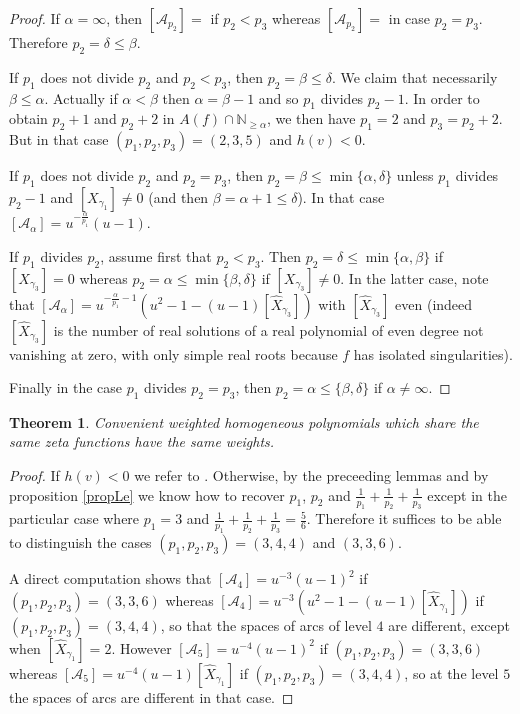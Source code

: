 \documentclass[12pt,a4paper,leqno]{amsart}
\newtheorem{thm}{Theorem}[section]
\theoremstyle{definition}
\begin{document}
\begin{proof}
If $\alpha =\infty$, then $[\mathcal A_{p_2}]=$ if $p_2<p_3$ whereas
$[\mathcal A_{p_2}]=$ in case $p_2=p_3$. Therefore $p_2=\delta \leq \beta$.

If $p_1$ does not divide $p_2$ and $p_2<p_3$, then $p_2=\beta
\leq \delta$. We claim that necessarily $\beta \leq
\alpha$. Actually if $\alpha<\beta$ then $\alpha=\beta-1$ and so $p_1$
divides $p_2-1$. In order to obtain $p_2+1$ and $p_2+2$ in $A(f)\cap
\mathbb N_{\geq \alpha}$, we then have $p_1=2$ and $p_3=p_2+2$. But in
that case $(p_1,p_2,p_3)=(2,3,5)$ and $h(v)<0$.

If $p_1$ does not divide $p_2$ and $p_2=p_3$, then
$p_2=\beta \leq \min \{\alpha,\delta\}$ unless $p_1$ divides $p_2-1$ and
$[X_{\gamma_1}]\neq 0$ (and then $\beta=\alpha+1\leq \delta$). In that case $[\mathcal
A_{\alpha}]=u ^{-\frac{\alpha}{p_1}}(u-1)$.

If $p_1$ divides $p_2$, assume first that $p_2<p
_3$. Then $p_2=\delta \leq \min \{\alpha, \beta\}$ if
$[X_{\gamma_3}]= 0$ whereas $p_2=\alpha \leq \min\{\beta, \delta\}$ if
$[X_{\gamma_3}]\neq 0$. In the latter case, note that $[\mathcal
A_{\alpha}]=u ^{-\frac{\alpha}{p_1}-1}(u^2-1-(u-1)[\widehat
X_{\gamma_3}])$ with $[\widehat X_{\gamma_3}]$ even (indeed $[\widehat
X_{\gamma_3}]$ is the number of real solutions of a real
polynomial of even degree not vanishing at zero, with only simple real
roots because $f$ has isolated singularities). 

Finally in the case $p_1$ divides $p_2=p_3$, then $p_2=\alpha \leq \{\beta,
\delta\}$ if $\alpha \neq \infty$.

\end{proof}

\begin{thm}\label{w3}  Convenient weighted
  homogeneous polynomials which share the same zeta functions have the
  same weights.
\end{thm}

\begin{proof} If $h(v)<0$ we refer to \cite{simple}. Otherwise, by the preceeding lemmas and by proposition \ref{propLe}
  we know how to recover $p_1$, $p_2$ and
  $\frac{1}{p_1}+\frac{1}{p_2}+\frac{1}{p_3}$ except in the particular
  case where $p_1=3$ and
  $\frac{1}{p_1}+\frac{1}{p_2}+\frac{1}{p_3}=\frac{5}{6}$. Therefore
  it suffices to be able to distinguish the cases $(p_1,p_2,p_3)=(3,4,4)$ and
  $(3,3,6)$. 

A direct computation shows that $[\mathcal A_{4}]=u ^{-3}(u-1)^2$
if $(p_1,p_2,p_3)=(3,3,6)$ whereas  $[\mathcal A_{4}]=u ^{-3}(u^2-1-(u-1)[\widehat X_{\gamma_1}])$
if $(p_1,p_2,p_3)=(3,4,4)$, so that the spaces of arcs of level $4$ are different, except when
$[\widehat X_{\gamma_1}]=2$. However $[\mathcal A_{5}]=u ^{-4}(u-1)^2$ if
  $(p_1,p_2,p_3)=(3,3,6)$ whereas $[\mathcal A_{5}]=u
  ^{-4}(u-1)[\widehat X_{\gamma_1}]$ if $(p_1,p_2,p_3)=(3,4,4)$,
  so at the level $5$ the spaces of arcs are different in that case.
\end{proof}
\end{document}
